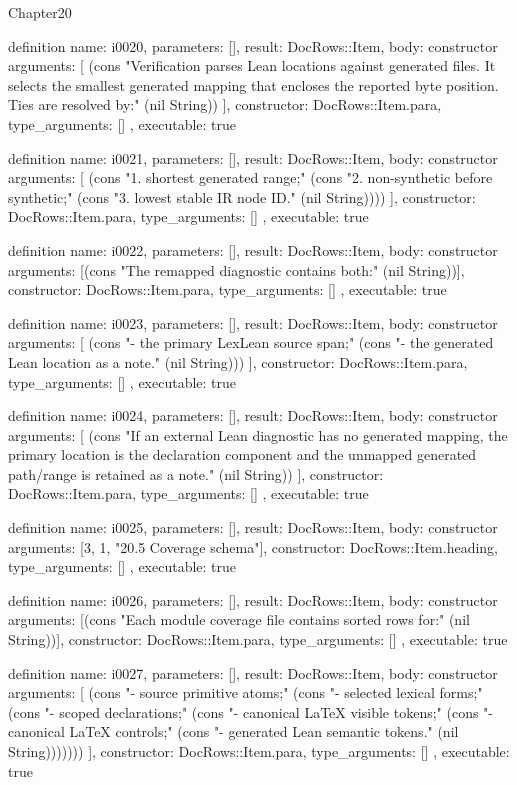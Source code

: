 \begin{lexlean}{Chapter20}
\begin{semanticmodule}
definition{
  name: i0020,
  parameters: [],
  result: DocRows::Item,
  body: constructor{
    arguments: [
      (cons "Verification parses Lean locations against generated files. It selects the smallest generated mapping that encloses the reported byte position. Ties are resolved by:" (nil String))
    ],
    constructor: DocRows::Item.para,
    type_arguments: []
  },
  executable: true
}

definition{
  name: i0021,
  parameters: [],
  result: DocRows::Item,
  body: constructor{
    arguments: [
      (cons "1. shortest generated range;" (cons "2. non-synthetic before synthetic;" (cons "3. lowest stable IR node ID." (nil String))))
    ],
    constructor: DocRows::Item.para,
    type_arguments: []
  },
  executable: true
}

definition{
  name: i0022,
  parameters: [],
  result: DocRows::Item,
  body: constructor{
    arguments: [(cons "The remapped diagnostic contains both:" (nil String))],
    constructor: DocRows::Item.para,
    type_arguments: []
  },
  executable: true
}

definition{
  name: i0023,
  parameters: [],
  result: DocRows::Item,
  body: constructor{
    arguments: [
      (cons "- the primary LexLean source span;" (cons "- the generated Lean location as a note." (nil String)))
    ],
    constructor: DocRows::Item.para,
    type_arguments: []
  },
  executable: true
}

definition{
  name: i0024,
  parameters: [],
  result: DocRows::Item,
  body: constructor{
    arguments: [
      (cons "If an external Lean diagnostic has no generated mapping, the primary location is the declaration component and the unmapped generated path/range is retained as a note." (nil String))
    ],
    constructor: DocRows::Item.para,
    type_arguments: []
  },
  executable: true
}

definition{
  name: i0025,
  parameters: [],
  result: DocRows::Item,
  body: constructor{
    arguments: [3, 1, "20.5 Coverage schema"],
    constructor: DocRows::Item.heading,
    type_arguments: []
  },
  executable: true
}

definition{
  name: i0026,
  parameters: [],
  result: DocRows::Item,
  body: constructor{
    arguments: [(cons "Each module coverage file contains sorted rows for:" (nil String))],
    constructor: DocRows::Item.para,
    type_arguments: []
  },
  executable: true
}

definition{
  name: i0027,
  parameters: [],
  result: DocRows::Item,
  body: constructor{
    arguments: [
      (cons "- source primitive atoms;" (cons "- selected lexical forms;" (cons "- scoped declarations;" (cons "- canonical LaTeX visible tokens;" (cons "- canonical LaTeX controls;" (cons "- generated Lean semantic tokens." (nil String)))))))
    ],
    constructor: DocRows::Item.para,
    type_arguments: []
  },
  executable: true
}


\end{semanticmodule}
\end{lexlean}
